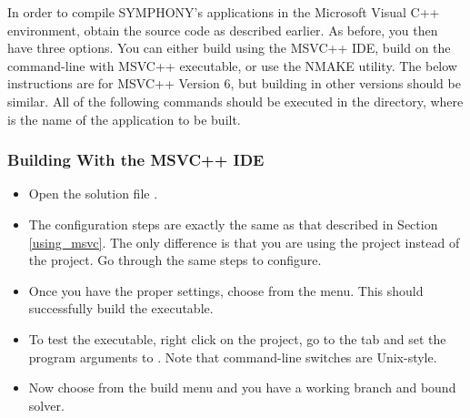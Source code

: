In order to compile SYMPHONY's applications in the Microsoft Visual C++
environment, obtain the source code as described earlier. As before, you then
have three options. You can either build using the MSVC++ IDE, build on the
command-line with MSVC++ executable, or use the NMAKE utility. The below
instructions are for MSVC++ Version 6, but building in other versions should
be similar. All of the following commands should be executed in the
 directory,
where  is the name of the application to be built.

\subsubsection{Building With the MSVC++ IDE}

\begin{itemize}

\item Open the solution file .

\item The configuration steps are exactly the same as that described in
  Section \ref{using_msvc}. The only difference is that you are using the
   project instead of the  project. Go through the
  same steps to configure.

\item Once you have the proper settings, choose  from the  menu. This should successfully 
build the executable.

\item
To test the executable, right click on the  project, go to the
 tab and set the program arguments to 
. Note that command-line switches are 
Unix-style.

\item
Now choose  from the build menu and you have a working branch
and bound solver. 

\end{itemize}

